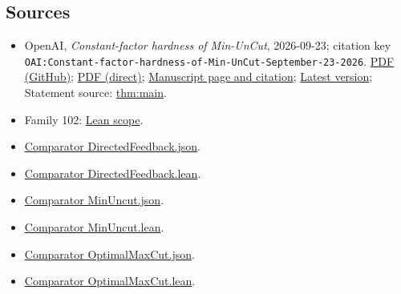 \documentclass[11pt]{article}
\begin{document}
\subsection{Sources}
\begin{itemize}
\item OpenAI, \emph{Constant-factor hardness of Min-UnCut}, 2026-09-23; citation key \texttt{OAI:Constant-factor-hardness-of-Min-UnCut-September-23-2026}. \href{https://github.com/openai/math/blob/adc7f1241b42e322a6451854ab7e4b4c146bf78a/preprints/Constant-factor-hardness-of-Min-UnCut-September-23-2026/paper.pdf}{PDF (GitHub)}; \href{https://github.com/openai/math/raw/adc7f1241b42e322a6451854ab7e4b4c146bf78a/preprints/Constant-factor-hardness-of-Min-UnCut-September-23-2026/paper.pdf}{PDF (direct)}; \href{https://github.com/openai/math/blob/adc7f1241b42e322a6451854ab7e4b4c146bf78a/preprints/Constant-factor-hardness-of-Min-UnCut-September-23-2026/README.md}{Manuscript page and citation}; \href{https://github.com/openai/math/blob/main/preprints/Constant-factor-hardness-of-Min-UnCut-September-23-2026/paper.pdf}{Latest version}; Statement source: \href{https://github.com/openai/math/blob/adc7f1241b42e322a6451854ab7e4b4c146bf78a/preprints/Constant-factor-hardness-of-Min-UnCut-September-23-2026/build/sections/introduction.tex\#L50}{thm:main}.
\item Family 102: \href{https://github.com/openai/math/blob/adc7f1241b42e322a6451854ab7e4b4c146bf78a/lean/docs/102.md}{Lean scope}.
\item \href{https://github.com/openai/math/blob/adc7f1241b42e322a6451854ab7e4b4c146bf78a/lean/ComparatorChallenges/DirectedFeedback.json}{Comparator DirectedFeedback.json}.
\item \href{https://github.com/openai/math/blob/adc7f1241b42e322a6451854ab7e4b4c146bf78a/lean/ComparatorChallenges/DirectedFeedback.lean}{Comparator DirectedFeedback.lean}.
\item \href{https://github.com/openai/math/blob/adc7f1241b42e322a6451854ab7e4b4c146bf78a/lean/ComparatorChallenges/MinUncut.json}{Comparator MinUncut.json}.
\item \href{https://github.com/openai/math/blob/adc7f1241b42e322a6451854ab7e4b4c146bf78a/lean/ComparatorChallenges/MinUncut.lean}{Comparator MinUncut.lean}.
\item \href{https://github.com/openai/math/blob/adc7f1241b42e322a6451854ab7e4b4c146bf78a/lean/ComparatorChallenges/OptimalMaxCut.json}{Comparator OptimalMaxCut.json}.
\item \href{https://github.com/openai/math/blob/adc7f1241b42e322a6451854ab7e4b4c146bf78a/lean/ComparatorChallenges/OptimalMaxCut.lean}{Comparator OptimalMaxCut.lean}.

\end{itemize}
\end{document}
